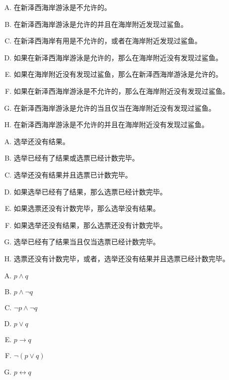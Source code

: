 {{        %
        \begin{practices}
            \begin{enumerate}[A.]
                \item 在新泽西海岸游泳是不允许的。
                \item 在新泽西海岸游泳是允许的并且在海岸附近发现过鲨鱼。
                \item 在新泽西海岸有用是不允许的，或者在海岸附近发现过鲨鱼。
                \item 如果在新泽西海岸游泳是允许的，那么在海岸附近没有发现过鲨鱼。
                \item 如果在海岸附近没有发现过鲨鱼，那么在新泽西海岸游泳是允许的。
                \item 如果在新泽西海岸游泳是不允许的，那么在海岸附近没有发现过鲨鱼。
                \item 在新泽西海岸游泳是允许的当且仅当在海岸附近没有发现过鲨鱼。
                \item 在新泽西海岸游泳是不允许的并且在海岸附近没有发现过鲨鱼。
            \end{enumerate}
        \end{practices}

        \begin{practices}
            \begin{enumerate}[A.]
                \item 选举还没有结果。
                \item 选举已经有了结果或选票已经计数完毕。
                \item 选举还没有结果并且选票已计数完毕。
                \item 如果选举已经有了结果，那么选票已经计数完毕。
                \item 如果选票还没有计数完毕，那么选举没有结果。
                \item 如果选举还没有结果，那么选票还没有计数完毕。
                \item 选举已经有了结果当且仅当选票已经计数完毕。
                \item 选票还没有计数完毕，或者，选举还没有结果并且选票已经计数完毕。
            \end{enumerate}
        \end{practices}

        \begin{practices}
            \begin{enumerate}[A.]
                \item $p \wedge q$
                \item $p \wedge \neg q$
                \item $\neg p \wedge \neg q$
                \item $p \vee q$
                \item $p \rightarrow q$
                \item $\neg(p \vee q)$
                \item $p \leftrightarrow q$
            \end{enumerate}
        \end{practices}

}}
